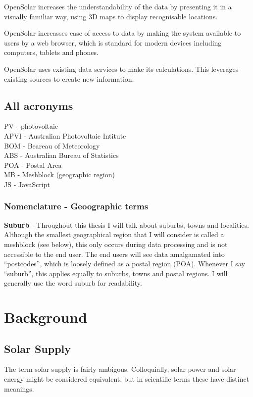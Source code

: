 \documentclass[12pt,a4paper]{report}
\begin{document}
OpenSolar increases the understandability of the data by presenting it in a visually familiar way, using 3D maps to display recognisable locations.

OpenSolar increasses ease of access to data by making the system available to users by a web browser, which is standard for modern devices including computers, tablets and phones.

OpenSolar uses existing data services to make its calculations. This leverages existing sources to create new information.

\subsection{All acronyms}

PV - photovoltaic \\
APVI - Australian Photovoltaic Intitute \\
BOM - Beareau of Meteorology \\
ABS - Australian Bureau of Statistics \\
POA - Postal Area \\
MB - Meshblock (geographic region) \\
JS - JavaScript \\


\subsubsection{Nomenclature - Geoographic terms}

\textbf{Suburb} - Throughout this thesis I will talk about suburbs, towns and localities. Although the smallest geographical region that I will consider is called a meshblock (see below), this only occurs during data processing and is not accessible to the end user. The end users will see data amalgamated into ``postcodes'', which is loosely defined as a postal region (POA). Whenever I say ``suburb'', this applies equally to suburbs, towns and postal regions.  I will generally use the word suburb for readability.

\section{Background}

\subsection{Solar Supply}

The term solar supply is fairly ambigous. Colloquially, solar power and solar energy might be considered equivalent, but in scientific terms these have distinct meanings. 
\end{document}
